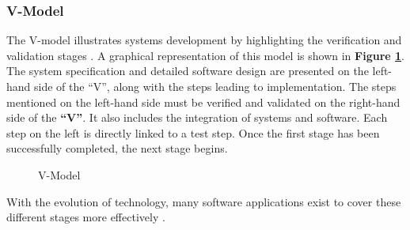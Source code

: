     
\subsubsection{V-Model}
The V-model illustrates systems development by highlighting the verification and validation stages \cite{clark2009system}. A graphical representation of this model is shown in \textbf{Figure \ref{fig:v-model}}. The system specification and detailed software design are presented on the left-hand side of the “V”, along with the steps leading to implementation. The steps mentioned on the left-hand side must be verified and validated on the right-hand side of the \textbf{“V”}. It also includes the integration of systems and software. Each step on the left is directly linked to a test step. Once the first stage has been successfully completed, the next stage begins.\\

\begin{figure}[H]
    \centering
    \caption[V-Model]{\label{fig:v-model} V-Model \cite{clark2009system} }
\end{figure}

With the evolution of technology, many software applications exist to cover these different stages more effectively \cite{johansson1999v}. 